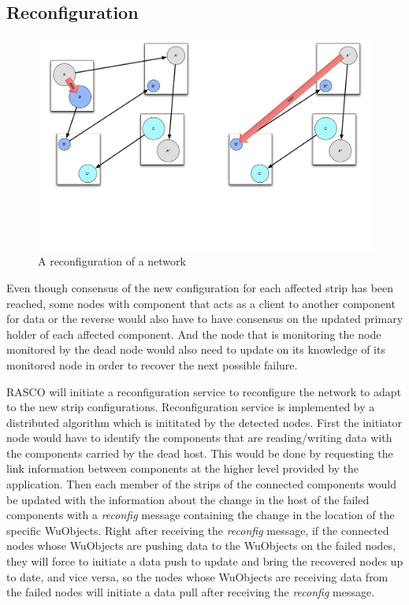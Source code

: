 
\subsection{Reconfiguration}
\label{s:reconfig}

\begin{figure}[h!]
\caption{A reconfiguration of a network}
\label{fig:reconfig-network}
\centering
    \includegraphics[width=\linewidth]{figures/reconfig-network}
\end{figure}

Even though consensus of the new configuration for each affected strip has been
reached, some nodes with component that acts as a client to another component
for data or the reverse would also have to have consensus on the updated
primary holder of each affected component. And the node that is monitoring the
node monitored by the dead node would also need to update on its knowledge of
its monitored node in order to recover the next possible failure.

RASCO will initiate a reconfiguration service to reconfigure the network to adapt
to the new strip configurations. Reconfiguration service is implemented by
a distributed algorithm which is inititated by the detected nodes. First the
initiator node would have to identify the components that are reading/writing
data with the components carried by the dead host. This would be done by
requesting the link information between components at the higher level provided
by the application. Then each member of the strips of the connected components
would be updated with the information about the change in the host of the
failed components with a \emph{reconfig} message containing the change in the
location of the specific WuObjects. Right after receiving the \emph{reconfig}
message, if the connected nodes whose WuObjects are pushing data to the
WuObjects on the failed nodes, they will force to initiate a data push to
update and bring the recovered nodes up to date, and vice versa, so the nodes
whose WuObjects are receiving data from the failed nodes will initiate a data
pull after receiving the \emph{reconfig} message.

